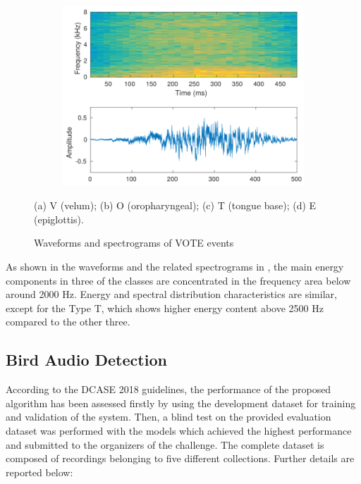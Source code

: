 \begin{figure}[t]
\begin{subfigure}{.40\textwidth}
		\caption{}
		\label{fig:T}
	\end{subfigure}
	\begin{subfigure}{.40\textwidth}
		\includegraphics[width=0.9\linewidth]{img/E_spec_crop.pdf}
		\caption{}
		\label{fig:E}
	\end{subfigure}
	\caption{Waveforms and spectrograms of VOTE events}{(a) V (velum); (b) O (oropharyngeal); (c) T (tongue base); (d) E (epiglottis).}
	\label{fig:spectrograms}
\end{figure}
As shown in the waveforms and the related spectrograms in , the main energy components in three of the classes are concentrated in the frequency area below around 2000 Hz. Energy and spectral distribution characteristics are similar, except for the Type T, which shows higher energy content above 2500 Hz compared to the other three.


\subsection{Bird Audio Detection}
According to the DCASE 2018 guidelines, the performance of the proposed algorithm has been assessed firstly by using the development dataset for training and validation of the system. Then, a blind test on the provided evaluation dataset was performed with the models which achieved the highest performance and submitted to the organizers of the challenge. The complete dataset is composed of recordings belonging to five different collections. Further details are reported below: %

